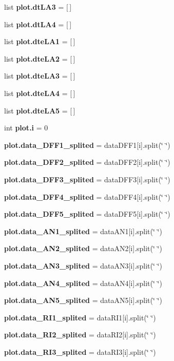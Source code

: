 \begin{DoxyCompactItemize}
\item 
list \textbf{ plot.\+dt\+L\+A3} = [$\,$]
\item 
list \textbf{ plot.\+dt\+L\+A4} = [$\,$]
\item 
list \textbf{ plot.\+dte\+L\+A1} = [$\,$]
\item 
list \textbf{ plot.\+dte\+L\+A2} = [$\,$]
\item 
list \textbf{ plot.\+dte\+L\+A3} = [$\,$]
\item 
list \textbf{ plot.\+dte\+L\+A4} = [$\,$]
\item 
list \textbf{ plot.\+dte\+L\+A5} = [$\,$]
\item 
int \textbf{ plot.\+i} = 0
\item 
\textbf{ plot.\+data\+\_\+\+D\+F\+F1\+\_\+splited} = data\+D\+F\+F1[i].split(\char`\"{} \char`\"{})
\item 
\textbf{ plot.\+data\+\_\+\+D\+F\+F2\+\_\+splited} = data\+D\+F\+F2[i].split(\char`\"{} \char`\"{})
\item 
\textbf{ plot.\+data\+\_\+\+D\+F\+F3\+\_\+splited} = data\+D\+F\+F3[i].split(\char`\"{} \char`\"{})
\item 
\textbf{ plot.\+data\+\_\+\+D\+F\+F4\+\_\+splited} = data\+D\+F\+F4[i].split(\char`\"{} \char`\"{})
\item 
\textbf{ plot.\+data\+\_\+\+D\+F\+F5\+\_\+splited} = data\+D\+F\+F5[i].split(\char`\"{} \char`\"{})
\item 
\textbf{ plot.\+data\+\_\+\+A\+N1\+\_\+splited} = data\+A\+N1[i].split(\char`\"{} \char`\"{})
\item 
\textbf{ plot.\+data\+\_\+\+A\+N2\+\_\+splited} = data\+A\+N2[i].split(\char`\"{} \char`\"{})
\item 
\textbf{ plot.\+data\+\_\+\+A\+N3\+\_\+splited} = data\+A\+N3[i].split(\char`\"{} \char`\"{})
\item 
\textbf{ plot.\+data\+\_\+\+A\+N4\+\_\+splited} = data\+A\+N4[i].split(\char`\"{} \char`\"{})
\item 
\textbf{ plot.\+data\+\_\+\+A\+N5\+\_\+splited} = data\+A\+N5[i].split(\char`\"{} \char`\"{})
\item 
\textbf{ plot.\+data\+\_\+\+R\+I1\+\_\+splited} = data\+R\+I1[i].split(\char`\"{} \char`\"{})
\item 
\textbf{ plot.\+data\+\_\+\+R\+I2\+\_\+splited} = data\+R\+I2[i].split(\char`\"{} \char`\"{})
\item 
\textbf{ plot.\+data\+\_\+\+R\+I3\+\_\+splited} = data\+R\+I3[i].split(\char`\"{} \char`\"{})
\item 

\end{DoxyCompactItemize}
